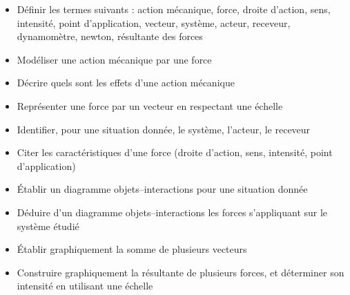 \begin{acquis}
\begin{itemize}
    \item Définir les termes suivants : action mécanique, force, droite d'action, sens, intensité, point d'application, vecteur, système, acteur, receveur, dynamomètre, newton, résultante des forces
%
    \item Modéliser une action mécanique par une force
%
    \item Décrire quels sont les effets d'une action mécanique
%
    \item Représenter une force par un vecteur en respectant une échelle
%
    \item Identifier, pour une situation donnée, le système, l'acteur, le receveur
%
    \item Citer les caractéristiques d'une force (droite d'action, sens, intensité, point d'application)
%
    \item Établir un diagramme objets--interactions pour une situation donnée
%
    \item Déduire d'un diagramme objets--interactions les forces s'appliquant sur le système étudié
%

    \item Établir graphiquement la somme de plusieurs vecteurs
%
    \item Construire graphiquement la résultante de plusieurs forces, et déterminer son intensité en utilisant une échelle
\end{itemize}
\end{acquis}



